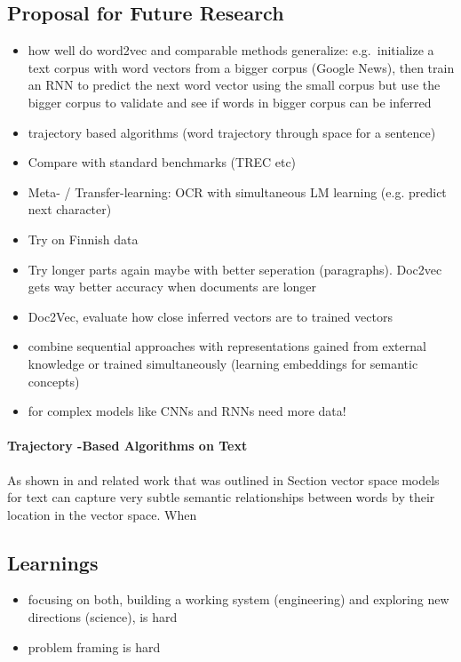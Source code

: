 \subsection{Proposal for Future Research}
\label{sub:further-research}

\begin{itemize}
  \item how well do word2vec and comparable methods generalize: e.g.\ initialize a text corpus with word vectors from a bigger corpus (Google News), then train an RNN to predict the next word vector using the small corpus but use the bigger corpus to validate and see if words in bigger corpus can be inferred
  \item trajectory based algorithms (word trajectory through space for a sentence)
  \item Compare with standard benchmarks (TREC etc)
  \item Meta- / Transfer-learning: OCR with simultaneous LM learning (e.g. predict next character)
  \item Try on Finnish data
  \item Try longer parts again maybe with better seperation (paragraphs). Doc2vec gets way better accuracy when documents are longer
  \item Doc2Vec, evaluate how close inferred vectors are to trained vectors
  \item combine sequential approaches with representations gained from external knowledge or trained simultaneously (learning embeddings for semantic concepts)
  \item for complex models like CNNs and RNNs need more data!
\end{itemize}


\paragraph{Trajectory -Based Algorithms on Text}
\label{par:Trajectory Algorithms on Text}
As shown in \cite{Mikolov:2013ac} and related work that was outlined in Section vector space models for text can capture very subtle semantic relationships between words by their location in the vector space. When


\subsection{Learnings}
\label{sub:learnings}

\begin{itemize}
  \item focusing on both, building a working system (engineering) and exploring new directions (science), is hard
  \item problem framing is hard
\end{itemize}
